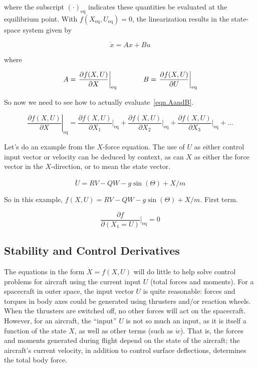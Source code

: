 where the subscript $(\cdot)_{\text{eq}}$ indicates these quantities be evaluated at the equilibrium point.
With $f(X_{\text{eq}},U_{\text{eq}})=0$, the linearization results in the state-space system given by

\begin{equation}
  \label{eqn.linss}
  \dot{x}=Ax+Bu
\end{equation}

where

\begin{equation}
  \label{eqn.AandB}
  A=\left.\frac{\partial{}f(X,U)}{\partial{}X}\right|_{\text{eq}}^{}
  \hspace{0.5in}
  B=\left.\frac{\partial{}f(X,U)}{\partial{}U}\right|_{\text{eq}}^{}
\end{equation}

So now we need to see how to actually evaluate\ \eqref{eqn.AandB}.

\begin{equation*}
  \left.\frac{\partial{}f(X,U)}{\partial{}X}\right|_{\text{eq}}^{} =\frac{\partial{}f(X,U)}{\partial{}X_{1}}\biggr|_{\text{eq}}+\frac{\partial{}f(X,U)}{\partial{}X_{2}}\biggr|_{\text{eq}}+\frac{\partial{}f(X,U)}{\partial{}X_{3}}\biggr|_{\text{eq}}+\dots
\end{equation*}

Let's do an example from the $X$-force equation.
The use of $U$ as either control input vector or velocity can be deduced by context, as can $X$ as either the force vector in the $X$-direction, or to mean the state vector.

\begin{equation*}
  \dot{U}=RV-QW-g\sin(\Theta)+X/m
\end{equation*}

So in this example, $f(X,U)=RV-QW-g\sin(\Theta)+X/m$.
First term.

\begin{equation*}
  \frac{\partial{}f}{\partial{}(X_{1}=U)}\biggr|_{\text{eq}}=0
\end{equation*}

\subsection{Stability and Control Derivatives}

The equations in the form $\dot{X}=f(X,U)$ will do little to help solve control problems for aircraft using the current input $U$ (total forces and moments).
For a spacecraft in outer space, the input vector $U$ is quite reasonable: forces and torques in body axes could be generated using thrusters and/or reaction wheels.
When the thrusters are switched off, no other forces will act on the spacecraft.
However, for an aircraft, the ``input'' $U$ is not so much an input, as it is itself a function of the state $X$, as well as other terms (such as $\dot{w}$).
That is, the forces and moments generated during flight depend on the state of the aircraft; the aircraft's current velocity, in addition to control surface deflections, determines the total body force.

